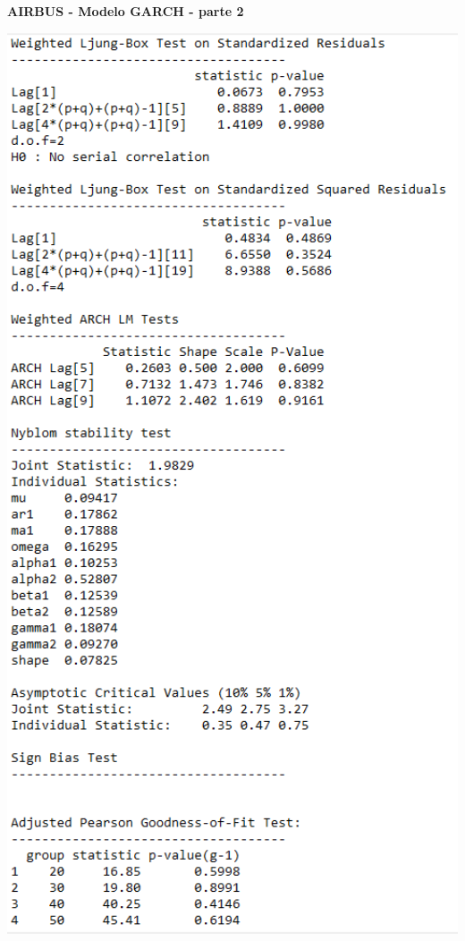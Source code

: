 \documentclass[
  12pt,
  a4paper,
  openany]{book}
\theoremstyle{definition}
\theoremstyle{definition}
\theoremstyle{definition}
\theoremstyle{remark}
\begin{document}
\begin{center}
 {\normalfont\Large\bfseries AIRBUS - Modelo GARCH - parte 2}
\end{center}

\begin{center}
\begin{minipage}{0.90\linewidth}
    \centering
    \includegraphics[width=2\textwidth]{image/air2.png}
\end{minipage}
\end{center}
\end{document}
